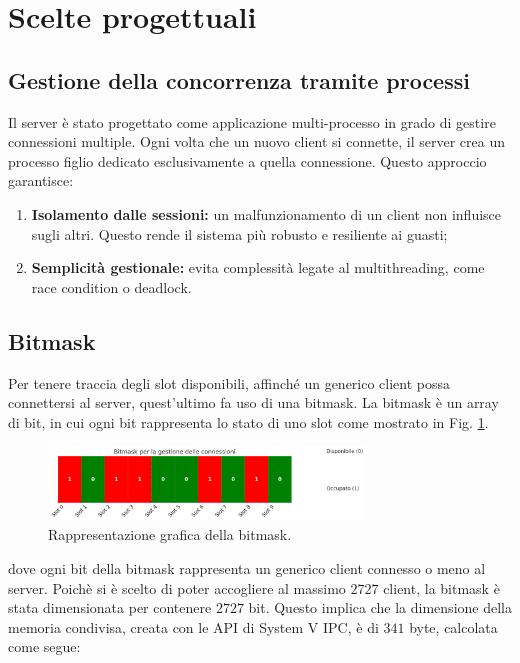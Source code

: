 \section{Scelte progettuali}

\subsection{Gestione della concorrenza tramite processi }
Il server è stato progettato come applicazione multi-processo in grado di gestire connessioni multiple.
Ogni volta che un nuovo client si connette, il server crea un processo figlio dedicato esclusivamente a quella connessione.
Questo approccio garantisce:
\begin{enumerate}
    \item \textbf{Isolamento dalle sessioni:} un malfunzionamento di un client non influisce sugli altri. Questo rende il sistema più robusto e resiliente ai guasti;
    \item \textbf{Semplicità gestionale:} evita complessità legate al multithreading, come race condition o deadlock.
\end{enumerate}

\subsection{Bitmask }
Per tenere traccia degli slot disponibili, affinché un generico client possa connettersi al server, quest'ultimo fa uso di una bitmask.
La bitmask è un array di bit, in cui ogni bit rappresenta lo stato di uno slot come mostrato in Fig. \ref{fig:bitmask}.

\begin{figure}[h]
    \centering
    \includegraphics[width=0.75\textwidth]{imgs/01/bitmask.png}
    \caption{Rappresentazione grafica della bitmask.}
    \label{fig:bitmask}
\end{figure}

dove ogni bit della bitmask rappresenta un generico client connesso o meno al server.
Poichè si è scelto di poter accogliere al massimo $2727$ client, la bitmask è stata dimensionata per contenere $2727$ bit.
Questo implica che la dimensione della memoria condivisa, creata con le API di System V IPC, è di $341$ byte, calcolata come segue:

